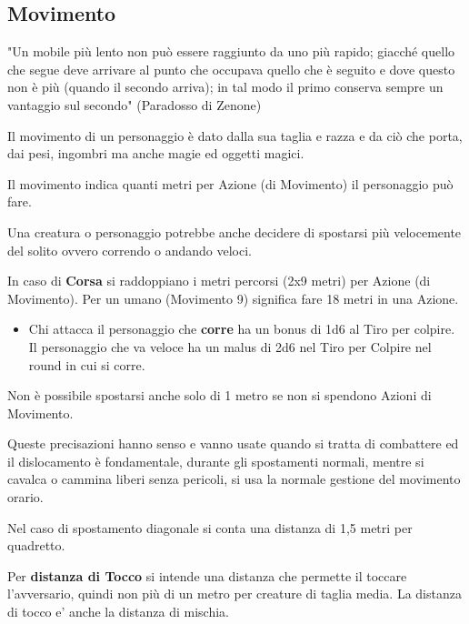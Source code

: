 \documentclass[a4paper,11pt,twoside,openany]{book}
\begin{document}
\pagebreak

\subsection{Movimento}

\label{movimento}

\begin{tcolorbox}[enhanced,arc=5pt,boxrule=0.3pt]{"Un mobile più lento non può essere raggiunto da uno più rapido; giacché quello che segue deve arrivare al punto che occupava quello che è seguito e dove questo non è più (quando il secondo arriva); in tal modo il primo conserva sempre un vantaggio sul secondo" (Paradosso di Zenone)}\end{tcolorbox}\medskip

Il movimento di un personaggio è dato dalla sua taglia e razza e da ciò che porta, dai pesi, ingombri ma anche magie ed oggetti magici.

Il movimento indica quanti metri per Azione (di Movimento) il personaggio può fare.

Una creatura o personaggio potrebbe anche decidere di spostarsi più velocemente del solito ovvero correndo o andando veloci.

In caso di \textbf{Corsa} si raddoppiano i metri percorsi (2x9 metri) per Azione (di Movimento). Per un umano (Movimento 9) significa fare 18 metri in una Azione.

\begin{itemize}
	\item Chi attacca il personaggio che \textbf{corre} ha un bonus di 1d6 al Tiro per colpire. Il personaggio che va veloce ha un malus di 2d6 nel Tiro per Colpire nel round in cui si corre.
\end{itemize}

Non è possibile spostarsi anche solo di 1 metro se non si spendono Azioni di Movimento.

Queste precisazioni hanno senso e vanno usate quando si tratta di combattere ed il dislocamento è fondamentale, durante gli spostamenti normali, mentre si cavalca o cammina liberi senza pericoli, si usa la normale gestione del movimento orario.

Nel caso di spostamento diagonale si conta una distanza di 1,5 metri per quadretto.

Per \textbf{distanza di Tocco}  si intende una distanza che permette il toccare l'avversario, quindi non più di un metro per creature di taglia media. La distanza di tocco e' anche la distanza di mischia.
\end{document}
